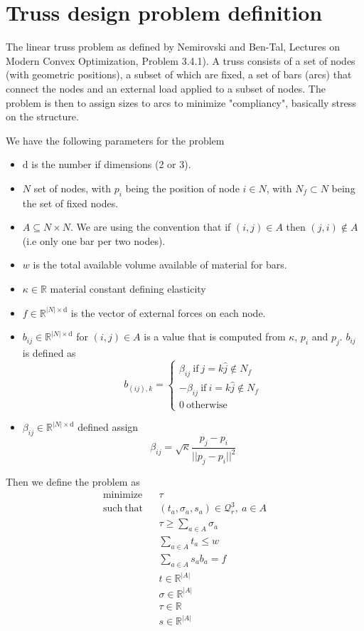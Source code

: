 \documentclass{article}
\begin{document}
\section{Truss design problem definition}

The linear truss problem as defined by Nemirovski and Ben-Tal,
Lectures on Modern Convex Optimization, Problem 3.4.1). A truss consists of a
set of nodes (with geometric positions), a subset of which are fixed, a set of
bars (arcs) that connect
the nodes and an external load applied to a subset of nodes. The problem is
then to assign sizes to arcs to minimize "compliancy", basically stress on the
structure.

We have the following parameters for the problem
\begin{itemize}
\item $\mathrm{d}$ is the number if dimensions (2 or 3).
\item $N$ set of nodes, with $p_i$ being the position of node $i\in N$, with $N_f\subset N$ being the set of fixed nodes.
\item $A\subseteq N\times N$. We are using the convention that if $(i,j)\in A$
    then $(j,i)\not\in A$ (i.e only one bar per two nodes). 
\item $w$ is the total available volume available of material for bars.
\item $\kappa\in\mathbb{R}$ material constant defining elasticity
\item $f\in\mathbb{R}^{|N|\times\mathrm{d}}$ is the vector of external forces on each node.
\item $b_{ij}\in\mathbb{R}^{|N|\times\mathrm{d}}$ for $(i,j)\in A$ is a value that is computed from $\kappa$, $p_i$ and $p_j$. $b_{ij}$ is defined as 
    \[
        b_{(ij),k} = \left\{ 
            \begin{array}{l}
                \beta_{ij}\ \mathrm{ if }\ j = k\hat j\not\in N_f \\
                -\beta_{ij}\ \mathrm{ if }\ i = k\hat j\not\in N_f \\
                0\  \mathrm{ otherwise}
            \end{array}
        \right.
    \]
\item $\beta_{ij}\in\mathbb{R}^{|N|\times\mathrm{d}}$ defined assign
    \[
        \beta_{ij} = \sqrt\kappa \frac{p_j-p_i}{||p_j-p_i||^2}
    \]
\end{itemize}

Then we define the problem as 
\begin{eqnarray}
    \mathrm{minimize} &&  \tau \\
    \mathrm{such\ that} 
    && (t_a,\sigma_a,s_a)\in\mathcal{Q}^3_r,\ a\in A\\
    && \tau \geq \sum_{a\in A} \sigma_a \\
    && \sum_{a\in A} t_a \leq w \\
    && \sum_{a\in A} s_a b_a = f \\
    && t\in\mathbb{R}^{|A|}\\
    && \sigma\in\mathbb{R}^{|A|} \\
    && \tau\in\mathbb{R}\\
    && s\in\mathbb{R}^{|A|} 
\end{eqnarray}
\end{document}
